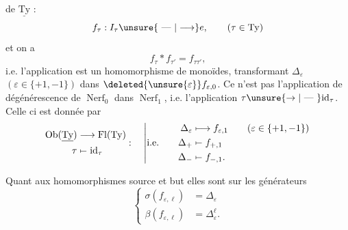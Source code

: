 
de $\underline{\mathrm{Ty}}$ :
\[
f_\tau:I_\tau\unsure{\text{ --- }|\longrightarrow}e,\qquad(\tau\in\mathrm{Ty})
\]
et on a
\[
f_\tau*f_{\tau'}=f_{\tau\tau'},
\]
i.e.  l'application
est un homomorphisme de monoïdes, transformant $\Delta_\varepsilon$ $(\varepsilon\in\{+1,-1\})$ dans $\deleted{\unsure{\varepsilon}} f_{\varepsilon,0}$.   Ce n'est pas l'application de dégénérescence de $\operatorname{Nerf}_0$ dans $\operatorname{Nerf}_1$, i.e. l'application $\tau\unsure{\rightarrow|\text{ --- }}\mathrm{id}_\tau$. Celle ci est donnée par
\[
\begin{aligned}
 \operatorname{Ob}(\underline{\mathrm{Ty}})&\longrightarrow \operatorname{Fl}(\mathrm{Ty})\\
 \tau&\mathrel{\mapstochar\relbar}\mathrm{id}_\tau
\end{aligned}
:\quad
\left|\begin{aligned}
\Delta_\varepsilon&\longmapsto f_{\varepsilon,1}\qquad(\varepsilon\in\{+1,-1\})\\
\text{i.e.}\qquad \Delta_+&\mathrel{\mapstochar\relbar} f_{+,1}\\
\Delta_-&\mathrel{\mapstochar\relbar} f_{-,1}.
\end{aligned}\right.
\]

Quant aux homomorphismes source et but
elles sont  sur les générateurs
\[
\left\{\begin{aligned}
\sigma(f_{\varepsilon,\ell})&=\Delta_\varepsilon\\
\beta(f_{\varepsilon,\ell})&=\Delta_\varepsilon^\ell.
\end{aligned}\right.
\]

